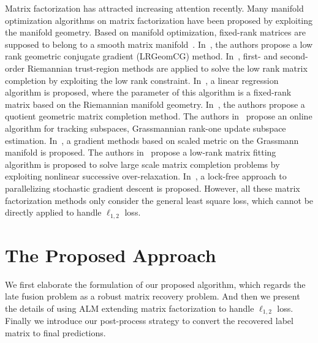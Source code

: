\documentclass[letterpaper]{article}
\begin{document}
Matrix factorization has attracted increasing attention recently.
Many manifold optimization algorithms on matrix factorization have been proposed by exploiting the manifold geometry.
Based on manifold optimization, fixed-rank matrices are supposed to belong to a smooth matrix manifold~\cite{Absil2008OAMM,vandereycken2013lowrank}.
In~\cite{vandereycken2013lowrank}, the authors propose a low rank geometric conjugate gradient (LRGeomCG) method.
In~\cite{rtrmc2011boumal}, first- and second-order Riemannian trust-region methods are applied to solve the low rank matrix completion by exploiting the low rank constraint.
In~\cite{Bonnabel2011}, a linear regression algorithm is proposed, where the parameter of this algorithm is a fixed-rank matrix based on the Riemannian manifold geometry.
In~\cite{Mishra2012}, the authors propose a quotient geometric matrix completion method.
The authors in~\cite{grouse2010Balzano} propose an online algorithm for tracking subspaces, Grassmannian rank-one update subspace estimation.
In~\cite{ngonips2012scaled}, a gradient methods based on scaled metric on the Grassmann manifold is proposed.
The authors in~\cite{Wen2012} propose a low-rank matrix fitting algorithm is proposed to solve large scale matrix completion problems by exploiting nonlinear successive over-relaxation.
In~\cite{RechtNIPS2011hogwild}, a lock-free approach to parallelizing stochastic gradient descent is proposed.
However, all these matrix factorization methods only consider the general least square loss, which cannot be directly applied to handle $\ell_{1,2}$ loss.




\section{The Proposed Approach}

We first elaborate the formulation of our proposed algorithm,
which regards the late fusion problem as a robust matrix recovery problem.
And then we present the details of using ALM extending matrix factorization to handle $\ell_{1,2}$ loss.
Finally we introduce our post-process strategy to convert the recovered label matrix to final predictions.
\end{document}
